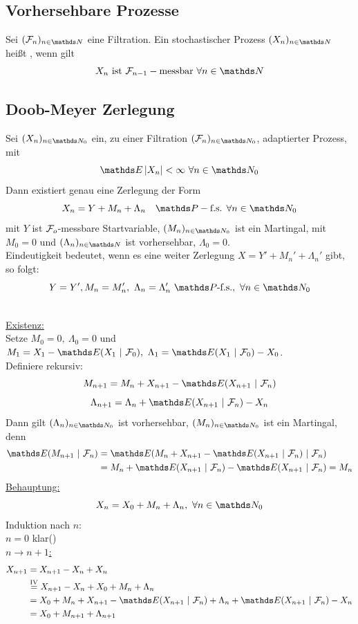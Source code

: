 \subsection{Vorhersehbare Prozesse}
\label{sub:vorher_prozesse}
Sei $(\F_n)_{n\in \N}$ eine Filtration. Ein stochastischer Prozess $(X_n)_{n\in \N}$ heißt , wenn gilt 
\[ 
X_n\text{ ist } \F_{n-1}-\text{messbar }\forall n \in \N
\]

\newpage
\subsection{Doob-Meyer Zerlegung}
\label{sub:doob-meyer}
Sei $(X_n)_{n\in \N_0}$ ein, zu einer Filtration $(\F_n)_{n\in \N_0}$, adaptierter Prozess, mit 
\[
\E\abs{X_n}<\infty~\forall n\in\N_0
\]
Dann existiert genau eine Zerlegung der Form 
\[
X_n= Y + M_n + \Lambda_n \quad \Pw-\text{f.s. }\forall n\in \N_0 
\]
mit $Y$ ist $\mathcal{F}_o$-messbare Startvariable, $(M_n)_{n\in \N_0}$ ist ein Martingal, mit $M_0=0$ und $(\Lambda_n)_{n\in \N}$ ist vorhersehbar, $\Lambda_0=0$.\\
Eindeutigkeit bedeutet, wenn es eine weiter Zerlegung $X=Y'+M_n'+\Lambda_n'$ gibt, so folgt: 
\[
Y=Y',M_n=M_n',~\Lambda_n=\Lambda_n'~\Pw\text{-f.s.},~\forall n\in \N_0  
\]

\\
\uline{Existenz:}\\
Setze $M_0=0,~\Lambda_0=0$ und $M_1=X_1-\E(X_1~|~\F_0),~\Lambda_1=\E(X_1~|~\F_0)-X_0$.\\
Definiere rekursiv:\\
\[ 
M_{n+1}=M_n+X_{n+1}-\E(X_{n+1}~|~\F_n) 
\]
\[
\Lambda_{n+1}=\Lambda_n+\E(X_{n+1}~|~\F_n)-X_n 
\]
Dann gilt $(\Lambda_n)_{n\in \N_0}$ ist vorhersehbar, $(M_n)_{n\in \N_0}$ ist ein Martingal, denn
\begin{equation*}
\begin{aligned}
	\E(M_{n+1}~|~\F_n) &= \E(M_n+X_{n+1}-\E(X_{n+1}~|~\F_n)~|~\F_n)\\
	&= M_n+\E(X_{n+1}~|~\F_n)-\E(X_{n+1}~|~\F_n)=M_n
\end{aligned}
\end{equation*}
\uline{Behauptung:} 
\[
X_n=X_0+M_n+\Lambda_n,~\forall n\in \N_0 
\]
Induktion nach $n$:\\
$n=0$ klar(\checkmark)\\
\uline{$n\to n+1$:}
\begin{equation*}
\begin{aligned}
	X_{n+1} &= X_{n+1}-X_n+X_n\\
	&\stackrel{\text{IV}}{=} X_{n+1}-X_n+X_0+M_n+\Lambda_n\\
	&= X_0+M_n+X_{n+1}-\E(X_{n+1}~|~\F_n)+\Lambda_n+\E(X_{n+1}~|~\F_n)-X_n\\
	&= X_0+M_{n+1}+\Lambda_{n+1}
\end{aligned}
\end{equation*}


